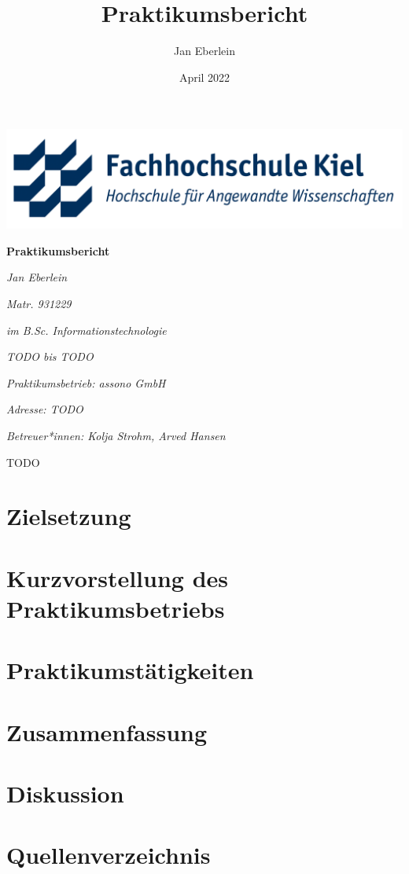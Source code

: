 \documentclass[12pt]{report}
\title{Praktikumsbericht}
\author{Jan Eberlein}
\date{April 2022}
\begin{document}
\begin{titlepage}
	\centering
	\includegraphics[width=1\textwidth]{./FHKielLogo.png}\par\vspace{1cm}
	\vspace{1.5cm}
	{\huge\bfseries Praktikumsbericht\par}
	\vspace{2cm}
	{\Large\itshape Jan Eberlein\par}
	{\Large\itshape Matr. 931229\par}
	{\Large\itshape im B.Sc. Informationstechnologie\par}
	{\Large\itshape TODO bis TODO\par}
	\vfill
	{\Large\itshape Praktikumsbetrieb: assono GmbH\par}
	{\Large\itshape Adresse: TODO\par}
	{\Large\itshape Betreuer*innen: Kolja Strohm, Arved Hansen\par}

	\vfill

	{\large TODO\par}
\end{titlepage}

\tableofcontents

\chapter{Zielsetzung}


\chapter{Kurzvorstellung des Praktikumsbetriebs}


\chapter{Praktikumstätigkeiten}


\chapter{Zusammenfassung}


\chapter{Diskussion}


\chapter{Quellenverzeichnis}
\end{document}
